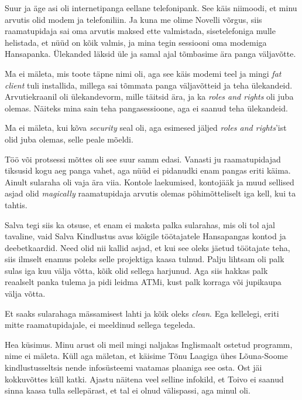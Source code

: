 Suur ja äge asi oli internetipanga eellane telefonipank. 
See käis niimoodi, et minu arvutis olid modem ja telefoniliin. Ja kuna me 
olime Novelli võrgus, siis raamatupidaja sai oma arvutis maksed ette 
valmistada, sisetelefoniga mulle helistada, et nüüd on kõik valmis, ja mina 
tegin sessiooni oma modemiga Hansapanka. Ülekanded 
läksid üle ja samal ajal tõmbasime ära panga väljavõtte. 


Ma ei mäleta, mis toote täpne nimi oli, aga see käis modemi teel ja mingi 
\emph{fat client} tuli installida, millega sai tõmmata panga väljavõtteid 
ja teha ülekandeid. Arvutiekraanil oli ülekandevorm, mille täitsid ära, 
ja ka \emph{roles and rights} oli juba olemas. Näiteks mina sain teha 
pangasessioone, aga ei saanud teha ülekandeid. 


Ma ei mäleta, kui kõva \emph{security} seal oli, aga 
esimesed jäljed \emph{roles and rights}'ist olid juba olemas, selle peale mõeldi. 

Töö või protsessi mõttes oli see suur samm edasi. Vanasti 
ju raamatupidajad tiksusid kogu aeg panga vahet, aga nüüd ei pidanudki 
enam pangas eriti käima. Ainult sularaha oli vaja ära viia. Kontole laekumised, kontojääk ja muud sellised asjad olid
\emph{magically} raamatupidaja arvutis olemas põhimõtteliselt iga kell, kui ta 
tahtis. 

Salva tegi siis ka otsuse, et enam ei maksta palka sularahas, mis oli tol ajal tavaline, vaid Salva Kindlustus avas kõigile 
töötajatele Hansapangas kontod ja deebetkaardid. Need
olid nii kallid asjad, et kui see oleks jäetud töötajate teha, siis ilmselt enamus 
poleks selle projektiga kaasa tulnud. Palju lihtsam oli palk sulas iga 
kuu välja võtta, kõik olid sellega harjunud. Aga siis hakkas palk reaalselt panka tulema 
ja pidi leidma ATMi, kust palk korraga või jupikaupa välja võtta. 


Et saaks sularahaga mässamisest lahti ja kõik oleks \emph{clean}. Ega 
kellelegi, eriti mitte raamatupidajale, ei meeldinud sellega tegeleda. 


Hea küsimus. Minu arust oli meil mingi naljakas 
Inglismaalt ostetud programm, nime ei mäleta. Küll aga mäletan, et 
käisime Tõnu Laagiga ühes Lõuna-Soome 
kindlustusseltsis nende infosüsteemi vaatamas plaaniga see osta. Ost 
jäi kokkuvõttes küll katki. Ajastu näitena veel selline infokild, 
et Toivo ei saanud sinna kaasa tulla sellepärast, et 
tal ei olnud välispassi, aga minul oli.

